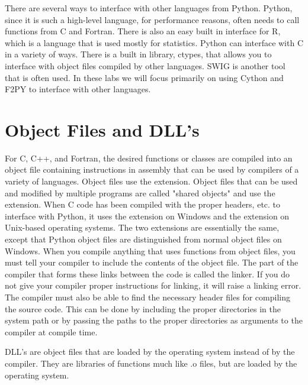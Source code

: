 \label{lab:cythonwrap}


There are several ways to interface with other languages from Python.
Python, since it is such a high-level language, for performance reasons, often needs to call functions from C and Fortran.
There is also an easy built in interface for R, which is a language that is used mostly for statistics.
Python can interface with C in a variety of ways.
There is a built in library, ctypes, that allows you to interface with object files compiled by other languages.
SWIG is another tool that is often used.
In these labs we will focus primarily on using Cython and F2PY to interface with other languages.

\section*{Object Files and DLL's}

For C, C++, and Fortran, the desired functions or classes are compiled into an object file containing instructions in assembly that can be used by compilers of a variety of languages.
Object files use the  extension.
Object files that can be used and modified by multiple programs are called "shared objects" and use the  extension.
When C code has been compiled with the proper headers, etc. to interface with Python, it uses the  extension on Windows and the  extension on Unix-based operating systems.
The two extensions are essentially the same, except that Python object files are distinguished from normal object files on Windows.
When you compile anything that uses functions from object files, you must tell your compiler to include the contents of the object file.
The part of the compiler that forms these links between the code is called the linker.
If you do not give your compiler proper instructions for linking, it will raise a linking error.
The compiler must also be able to find the necessary header files for compiling the source code.
This can be done by including the proper directories in the system path or by passing the paths to the proper directories as arguments to the compiler at compile time.

DLL's are object files that are loaded by the operating system instead of by the compiler.
They are libraries of functions much like .o files, but are loaded by the operating system.

